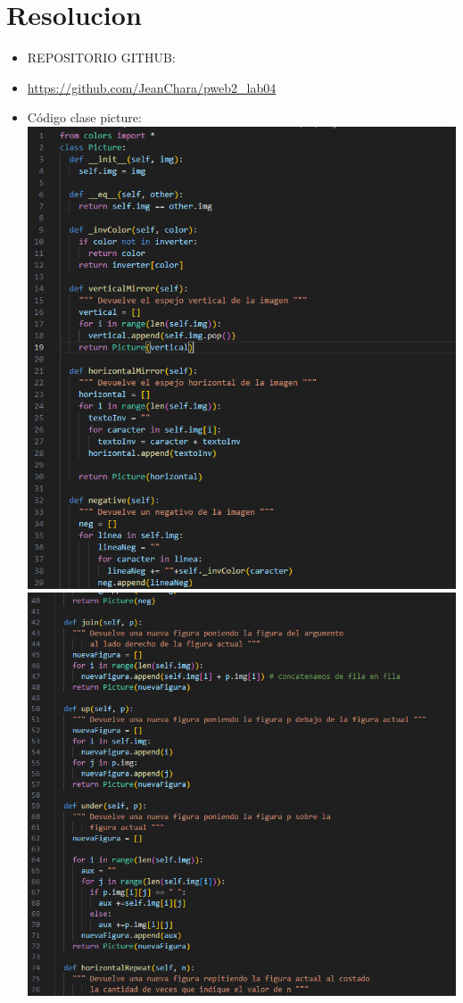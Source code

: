 \documentclass[]{article}
\begin{document}
    \section{Resolucion}
    	\begin{itemize}		
    		\item REPOSITORIO GITHUB: 
            \item 
            \url{https://github.com/JeanChara/pweb2_lab04}
    		\item Código clase picture:\\
            \includegraphics[]{../img/img1.png}
            \includegraphics[]{../img/img2.png}\\

\end{itemize}
\end{document}

